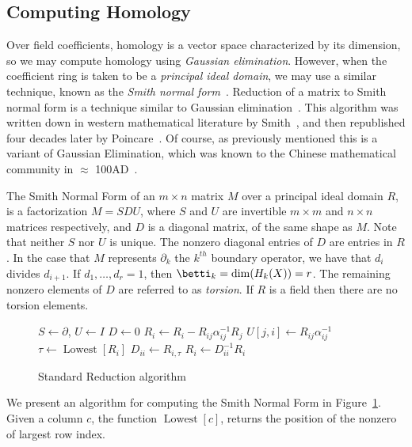 \subsection{Computing Homology}
Over field coefficients, homology is a vector space characterized by its dimension, so we may compute homology using \emph{Gaussian elimination}. However, when the coefficient ring is taken to be a \emph{principal ideal domain}, we may use a similar technique, known as the \emph{Smith normal form}~\cite{uhlig}. Reduction of a matrix to Smith normal form is a technique similar to Gaussian elimination~\cite{uhlig}. This algorithm was written down in western mathematical literature by Smith~\cite{smith}, and then republished four decades later by Poincare~\cite{poincare-smith}. Of course, as previously mentioned this is a variant of Gaussian Elimination, which was known to the Chinese mathematical community in $\approx$ 100AD~\cite{chinese-ge}.

The Smith Normal Form of an $m \times n$ matrix $M$ over a principal ideal domain $R$, is a factorization $M = SDU$, where $S$ and $U$ are invertible $m \times m$ and $n \times n$ matrices respectively, and $D$ is a diagonal matrix, of the same shape as $M$. Note that neither $S$ nor $U$ is unique. The nonzero diagonal entries of $D$ are entries in $R$. In the case that $M$ represents $\partial_k$ the $k^{th}$  boundary operator, we have that $d_i$ divides $d_{i+1}$. If $d_1, \ldots, d_r = 1$, then $\betti_k = \dim(H_k(X)) = r$. The remaining nonzero elements of $D$ are referred to as \emph{torsion}. If $R$ is a field then there are no torsion elements. 
\begin{figure}
\begin{codebox}
\li $S \gets \partial$, $U \gets I$
\li $D \gets 0$
\li {} 
\li \Do 
\li {}
\li \Do
\li   $R_i \gets R_i - R_{ij}\alpha^{-1}_{ij}R_j$
\li   $U[j,i] \gets R_{ij}\alpha^{-1}_{ij}$
    \End
\li   $\tau \gets \operatorname{Lowest}[R_i]$
\li   $D_{ii} \gets R_{i,\tau}$
\li   $R_{i} \gets D_{ii}^{-1}R_{i}$
\End
\end{codebox}
\caption{Standard Reduction algorithm}
\label{alg:smith}
\end{figure}

We present an algorithm for computing the Smith Normal Form in Figure~\ref{alg:smith}. Given a column $c$, the function $\operatorname{Lowest}[c]$, 
returns the position of the nonzero of largest row index.

